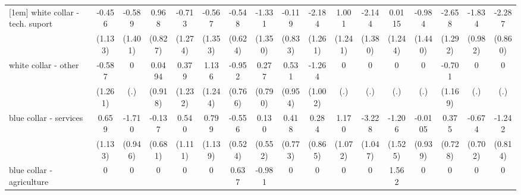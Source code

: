 {\begin{tabular}{l*{16}{c}}
[1em]
white collar - tech. suport&      -0.456         &      -0.589         &       0.968         &      -0.713         &      -0.567         &      -0.548         &      -1.331         &      -0.119         &      -2.184         &       1.001         &      -2.144         &      0.0115         &      -0.984         &      -2.658\sym{*}  &      -1.834         &      -2.287\sym{**} \\
                    &     (1.133)         &     (1.401)         &     (0.827)         &     (1.274)         &     (1.353)         &     (0.624)         &     (1.350)         &     (0.833)         &     (1.261)         &     (1.241)         &     (1.380)         &     (1.244)         &     (1.440)         &     (1.292)         &     (0.982)         &     (0.860)         \\
[1em]
white collar - other&      -0.587         &           0         &      0.0494         &       0.379         &       1.136         &      -0.952         &       0.277         &       0.531         &      -1.264         &           0         &           0         &           0         &           0         &      -0.701         &           0         &           0         \\
                    &     (1.261)         &         (.)         &     (0.918)         &     (1.232)         &     (1.244)         &     (0.766)         &     (0.790)         &     (0.954)         &     (1.002)         &         (.)         &         (.)         &         (.)         &         (.)         &     (1.169)         &         (.)         &         (.)         \\
[1em]
blue collar - services&       0.659         &      -1.710         &      -0.137         &       0.540         &       0.799         &      -0.556         &       0.130         &       0.418         &       0.284         &       1.170         &      -3.228\sym{**} &      -1.206         &     -0.0105         &       0.375         &      -0.674         &      -1.242         \\
                    &     (1.133)         &     (0.946)         &     (0.681)         &     (1.111)         &     (1.139)         &     (0.524)         &     (0.552)         &     (0.773)         &     (0.865)         &     (1.072)         &     (1.047)         &     (1.525)         &     (0.939)         &     (0.728)         &     (0.702)         &     (0.814)         \\
[1em]
blue collar - agriculture&           0         &           0         &           0         &           0         &           0         &       0.637         &      -0.981         &           0         &           0         &           0         &           0         &       1.562         &           0         &           0         &           0         &           0         \\

\end{tabular}}
